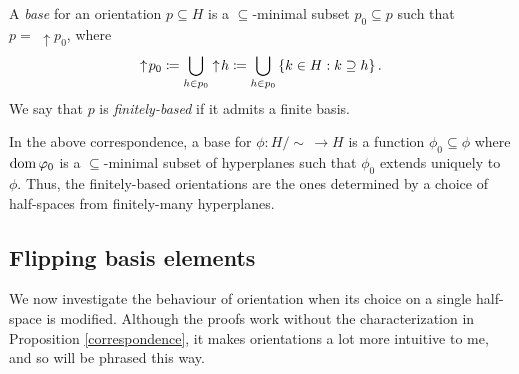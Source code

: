 \documentclass{amsart}
\begin{document}
    \begin{definition}
        A \textit{base} for an orientation $p\subseteq H$ is a $\subseteq$-minimal subset $p_0\subseteq p$ such that $p=\,\,\uparrow\! p_0$, where
        \begin{equation*}
            \uparrow\! p_0\coloneqq\bigcup_{h\in p_0}\uparrow\! h\coloneqq\bigcup_{h\in p_0}\left\{k\in H: k\supseteq h\right\}.
        \end{equation*}
        We say that $p$ is \textit{finitely-based} if it admits a finite basis.
    \end{definition}

    In the above correspondence, a base for $\phi:H/\!\sim\,\to H$ is a function $\phi_0\subseteq\phi$ where $\operatorname{dom}\varphi_0$ is a $\subseteq$-minimal subset of hyperplanes such that $\phi_0$ extends uniquely to $\phi$. Thus, the finitely-based orientations are the ones determined by a choice of half-spaces from finitely-many hyperplanes.

    \subsection{Flipping basis elements}

    We now investigate the behaviour of orientation when its choice on a single half-space is modified. Although the proofs work without the characterization in Proposition \ref{correspondence}, it makes orientations a lot more intuitive to me, and so will be phrased this way.
\end{document}
